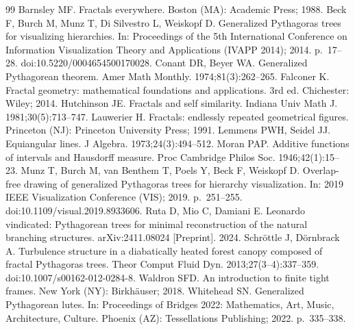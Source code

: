 \documentclass[12pt]{article}
\theoremstyle{plain}
\theoremstyle{remark}
\begin{document}
\begin{thebibliography}{99}
 Barnsley MF. Fractals everywhere. Boston (MA): Academic Press; 1988.
 Beck F, Burch M, Munz T, Di Silvestro L, Weiskopf D. Generalized
  Pythagoras trees for visualizing hierarchies. In: Proceedings of the 5th
  International Conference on Information Visualization Theory and Applications
  (IVAPP 2014); 2014. p.~17--28. doi:10.5220/0004654500170028.
 Conant DR, Beyer WA. Generalized Pythagorean theorem.
  Amer Math Monthly. 1974;81(3):262--265.
 Falconer K. Fractal geometry: mathematical foundations and
  applications. 3rd ed. Chichester: Wiley; 2014.
 Hutchinson JE. Fractals and self similarity. Indiana Univ Math J.
  1981;30(5):713--747.
 Lauwerier H. Fractals: endlessly repeated geometrical figures.
  Princeton (NJ): Princeton University Press; 1991.
 Lemmens PWH, Seidel JJ. Equiangular lines. J Algebra.
  1973;24(3):494--512.
 Moran PAP. Additive functions of intervals and Hausdorff measure.
  Proc Cambridge Philos Soc. 1946;42(1):15--23.
 Munz T, Burch M, van Benthem T, Poels Y, Beck F, Weiskopf D.
  Overlap-free drawing of generalized Pythagoras trees for hierarchy visualization.
  In: 2019 IEEE Visualization Conference (VIS); 2019. p.~251--255.
  doi:10.1109/visual.2019.8933606.
 Ruta D, Mio C, Damiani E. Leonardo vindicated: Pythagorean trees for
  minimal reconstruction of the natural branching structures. arXiv:2411.08024 [Preprint]. 2024.
 Schr\"ottle J, D\"ornbrack A. Turbulence structure in a
  diabatically heated forest canopy composed of fractal Pythagoras trees.
  Theor Comput Fluid Dyn. 2013;27(3--4):337--359. doi:10.1007/s00162-012-0284-8.
 Waldron SFD. An introduction to finite tight frames. New York (NY):
  Birkh\"auser; 2018.
 Whitehead SN. Generalized Pythagorean lutes. In: Proceedings of
  Bridges 2022: Mathematics, Art, Music, Architecture, Culture. Phoenix (AZ):
  Tessellations Publishing; 2022. p.~335--338.
\end{thebibliography}

\clearpage
\end{document}
